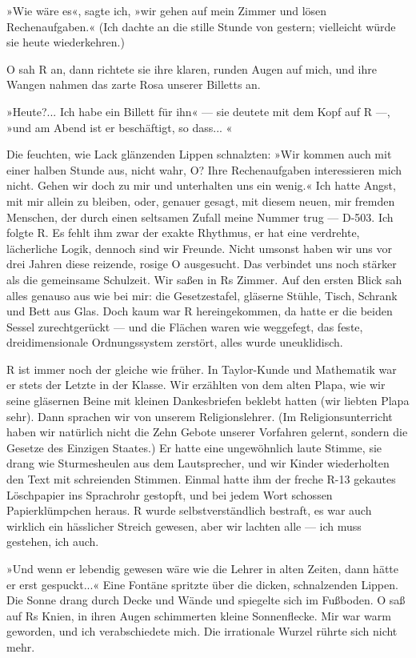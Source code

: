 »Wie wäre es«, sagte ich, »wir gehen auf mein Zimmer und lösen
Rechenaufgaben.« (Ich dachte an die stille Stunde von gestern;
vielleicht würde sie heute wiederkehren.)

O sah R an, dann richtete sie ihre klaren, runden Augen auf mich,
und ihre Wangen nahmen das zarte Rosa unserer Billetts an.

»Heute?... Ich habe ein Billett für ihn« — sie deutete mit dem Kopf
auf R —, »und am Abend ist er beschäftigt, so dass... «

Die feuchten, wie Lack glänzenden Lippen schnalzten: »Wir kommen
auch mit einer halben Stunde aus, nicht wahr, O? Ihre
Rechenaufgaben interessieren mich nicht. Gehen wir doch zu mir und
unterhalten uns ein wenig.« Ich hatte Angst, mit mir allein zu
bleiben, oder, genauer gesagt, mit diesem neuen, mir fremden
Menschen, der durch einen seltsamen Zufall meine Nummer trug —
D-503. Ich folgte R. Es fehlt ihm zwar der exakte Rhythmus, er hat
eine verdrehte, lächerliche Logik, dennoch sind wir Freunde. Nicht
umsonst haben wir uns vor drei Jahren diese reizende, rosige O
ausgesucht. Das verbindet uns noch stärker als die gemeinsame
Schulzeit. Wir saßen in Rs Zimmer. Auf den ersten Blick sah alles
genauso aus wie bei mir: die Gesetzestafel, gläserne Stühle, Tisch,
Schrank und Bett aus Glas. Doch kaum war R hereingekommen, da hatte
er die beiden Sessel zurechtgerückt — und die Flächen waren wie
weggefegt, das feste, dreidimensionale Ordnungssystem zerstört,
alles wurde uneuklidisch.

R ist immer noch der gleiche wie früher. In Taylor-Kunde und
Mathematik war er stets der Letzte in der Klasse. Wir erzählten von
dem alten Plapa, wie wir seine gläsernen Beine mit kleinen
Dankesbriefen beklebt hatten (wir liebten Plapa sehr). Dann
sprachen wir von unserem Religionslehrer. (Im Religionsunterricht
haben wir natürlich nicht die Zehn Gebote unserer Vorfahren
gelernt, sondern die Gesetze des Einzigen Staates.) Er hatte eine
ungewöhnlich laute Stimme, sie drang wie Sturmesheulen aus dem
Lautsprecher, und wir Kinder wiederholten den Text mit schreienden
Stimmen. Einmal hatte ihm der freche R-13 gekautes Löschpapier ins
Sprachrohr gestopft, und bei jedem Wort schossen Papierklümpchen
heraus. R wurde selbstverständlich bestraft, es war auch wirklich
ein hässlicher Streich gewesen, aber wir lachten alle — ich muss
gestehen, ich auch.

»Und wenn er lebendig gewesen wäre wie die Lehrer in alten Zeiten,
dann hätte er erst gespuckt...« Eine Fontäne spritzte über die
dicken, schnalzenden Lippen. Die Sonne drang durch Decke und Wände
und spiegelte sich im Fußboden. O saß auf Rs Knien, in ihren Augen
schimmerten kleine Sonnenflecke. Mir war warm geworden, und ich
verabschiedete mich. Die irrationale Wurzel rührte sich nicht
mehr.

